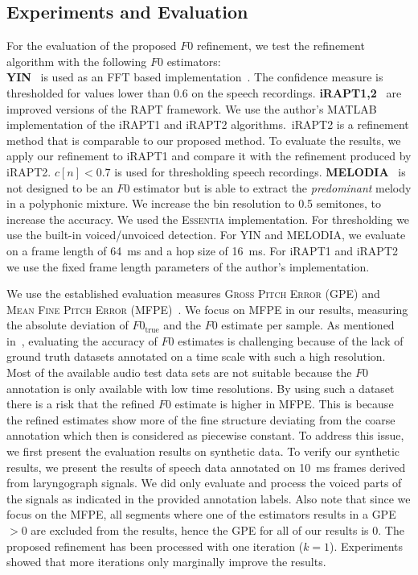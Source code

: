 \subsection{Experiments and Evaluation} %
\label{sec:experiments}

For the evaluation of the proposed $F0$ refinement, we test the refinement algorithm with the following $F0$ estimators:\\
\textbf{YIN}~\cite{decheveigne02} is used as an FFT based implementation~\cite{bogdanov13}. The confidence measure is thresholded for values lower than 0.6 on the speech recordings. \textbf{iRAPT1,2}~\cite{azarov12} are improved versions of the RAPT framework. We use the author's MATLAB implementation of the iRAPT1 and iRAPT2 algorithms.\ iRAPT2 is a refinement method that is comparable to our proposed method. To evaluate the results, we apply our refinement to iRAPT1 and compare it with the refinement produced by iRAPT2. $c[n] < 0.7$ is used for thresholding speech recordings. \textbf{MELODIA}~\cite{salamon12} is not designed to be an $F0$ estimator but is able to extract the \emph{predominant} melody in a polyphonic mixture. We increase the bin resolution to 0.5 semitones, to increase the accuracy. We used the \textsc{Essentia} implementation. For thresholding we use the built-in voiced/unvoiced detection.
For YIN and MELODIA, we evaluate on a frame length of 64~ms and a hop size of 16~ms. For iRAPT1 and iRAPT2  we use the fixed frame length parameters of the author's implementation.
\par
We use the established evaluation measures \textsc{Gross Pitch Error} (GPE) and \textsc{Mean Fine Pitch Error} (MFPE)~\cite{azarov12}. We focus on MFPE in our results, measuring the absolute deviation of $F0_{\mathrm{true}}$ and the $F0$ estimate per sample.
As mentioned in~\cite{resch07}, evaluating the accuracy of $F0$ estimates is challenging because of the lack of ground truth datasets annotated on a time scale with such a high resolution. Most of the available audio test data sets are not suitable because the $F0$ annotation is only available with low time resolutions. By using such a dataset there is a risk that the refined $F0$ estimate is higher in MFPE. This is because the refined estimates show more of the fine structure deviating from the coarse annotation which then is considered as piecewise constant. To address this issue, we first present the evaluation results on synthetic data. To verify our synthetic results, we present the results of speech data annotated on 10~ms frames derived from laryngograph signals. We did only evaluate and process the voiced parts of the signals as indicated in the provided annotation labels. Also note that since we focus on the MFPE, all segments where one of the estimators results in a GPE $> 0$ are excluded from the results, hence the GPE for all of our results is 0. The proposed refinement has been processed with one iteration ($k=1$). Experiments showed that more iterations only marginally improve the results.

